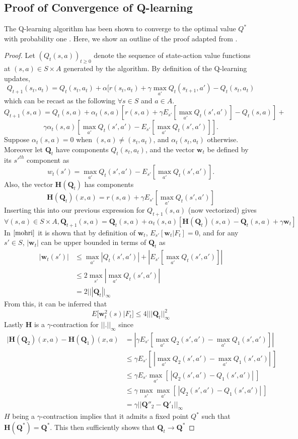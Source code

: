 \documentclass{article} %
\begin{document}
\subsection{Proof of Convergence of Q-learning}
The Q-learning algorithm has been shown to converge to the optimal value $Q^*$ with probability one \cite{mohri}.  Here, we show an outline of the proof adapted from \cite{mohri}.  
\begin{proof}
Let $(Q_t(s,a))_{t\geq 0}$ denote the sequence of state-action value functions at $(s,a) \in S \times A$ generated by the algorithm.  By definition of the Q-learning updates,
$$
Q_{t+1}(s_t,a_t) = Q_t(s_t,a_t) + \alpha[r(s_t,a_t) + \gamma \max_{a'}Q_t(s_{t+1},a') - Q_t(s_t,a_t)
$$
which can be recast as the following $\forall s \in S$ and $a \in A$.
$$
Q_{t+1}(s,a) = Q_t(s,a) + \alpha_t(s,a)[r(s,a) + \gamma E_{s'}[\max_{a'}Q_t(s',a')] - Q_t(s,a)] +
$$
$$
\gamma\alpha_t(s,a)[\max_{a'}Q_t(s',a') - E_{s'}[\max_{a'}Q_t(s',a')] ].
$$
Suppose $\alpha_t(s,a) = 0$ when $(s,a) \neq (s_t,a_t)$, and $\alpha_t(s_t,a_t)$ otherwise. Moreover let $\textbf{Q}_t$ have components $Q_t(s_t,a_t)$, and the vector $\textbf{w}_t$ be defined by its $s'^{th}$ component as
$$
w_t(s') = \max_{a'}Q_t(s',a') - E_{s'} [\max_{a'}Q_t(s',a') ].
$$
Also, the vector $\textbf{H}(\textbf{Q}_t)$ has components
$$
\textbf{H}(\textbf{Q}_t)(x,a) = r(s,a) + \gamma E_{s'}[\max_{a'}Q_t(s',a') ]
$$
Inserting this into our previous expression for $Q_{t+1}(s,a)$ (now vectorized) gives
$$
\forall (s,a) \in S \times A, \textbf{Q}_{t+1}(s,a) = \textbf{Q}_t(s,a) + \alpha_t(s,a)[\textbf{H}(\textbf{Q}_t)(s,a) - \textbf{Q}_t(s,a) + \gamma\textbf{w}_t]
$$
In $\cite{mohri}$ it is shown that by definition of $\textbf{w}_t$, $E_{s'}[\textbf{w}_t | F_t] = 0$, and for any $s' \in S$, $|\textbf{w}_t|$ can be upper bounded in terms of $\textbf{Q}_t$ as
\begin{align*}
|\textbf{w}_t(s')| &\leq \max_{a'}|Q_t(s',a')| + |E_{s'}[\max_{a'}Q_t(s',a')] | \\
& \leq 2\max_{s'}|\max_{a'}Q_t(s',a')|\\
&= 2|||\textbf{Q}_t||_{\infty}
\end{align*}
From this, it can be inferred that
$$
E[\textbf{w}^2_t(s) | F_t] \leq 4|||\textbf{Q}_t||^2_{\infty}
$$
Lastly $\textbf{H}$ is a $\gamma$-contraction for $||.||_{\infty}$ since
\begin{align*}
|\textbf{H}(\textbf{Q}_2)(x,a) - \textbf{H}(\textbf{Q}_1)(x,a) & = |\gamma E_{s'} [\max_{a'}Q_2(s',a') - \max_{a'}Q_1(s',a')] |\\
&\leq \gamma E_{s'}[ ~|\max_{a'}Q_2(s',a') - \max_{a'}Q_1(s',a')|~]\\
&\leq \gamma E_{s'}\max_{a'}[~|Q_2(s',a') - Q_1(s',a')|~]\\
&\leq \gamma \max_{s'}\max_{a'}[~|Q_2(s',a') - Q_1(s',a')|~]\\
&= \gamma||\textbf{Q}''_2 - \textbf{Q}'_1||_{\infty}
\end{align*}
$H$ being a $\gamma$-contraction implies that it admits a fixed point $Q^*$ such that $\textbf{H}(\textbf{Q}^*) = \textbf{Q}^*$. This then sufficiently shows that $\textbf{Q}_t \rightarrow \textbf{Q}^*$


\end{proof}
\end{document}
